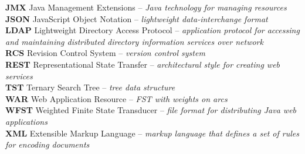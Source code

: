 \documentclass[12pt,a4paper]{report}
\let\openright=\clearpage
\begin{document}
\textbf{JMX} Java Management Extensions – \textit{Java technology for managing resources}
\\

\textbf{JSON} JavaScript Object Notation – \textit{lightweight data-interchange format}
\\

\textbf{LDAP} Lightweight Directory Access Protocol – \textit{application protocol for accessing and maintaining distributed directory information services over network}
\\

\textbf{RCS} Revision Control System – \textit{version control system}
\\

\textbf{REST} Representational State Transfer – \textit{architectural style for creating web services}
\\

\textbf{TST} Ternary Search Tree – \textit{tree data structure}
\\

\textbf{WAR} Web Application Resource – \textit{FST with weights on arcs}
\\

\textbf{WFST} Weighted Finite State Transducer – \textit{file format for distributing Java web applications}
\\

\textbf{XML} Extensible Markup Language – \textit{markup language that defines a set of rules for encoding documents}
\\

\appendix


\openright
\end{document}
